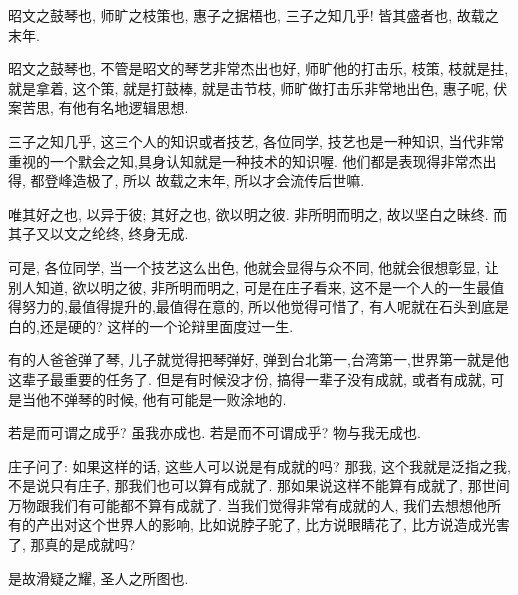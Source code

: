 \documentclass[11pt]{article}
\begin{document}
\begin{center}
	{\color{magenta} 昭文之鼓琴也, 师旷之枝策也, 惠子之据梧也, 三子之知几乎! 皆其盛者也, 故载之末年.}
\end{center}

\vspace{-0.5cm}

{\color{blue} 昭文之鼓琴也}, 不管是昭文的琴艺非常杰出也好, 师旷他的打击乐, 枝策, 枝就是拄, 就是拿着, 这个策, 就是打鼓棒, 就是击节枝, 师旷做打击乐非常地出色, 惠子呢, 伏案苦思, 有他有名地逻辑思想. 

{\color{blue} 三子之知几乎}, 这三个人的知识或者技艺, 各位同学, 技艺也是一种知识, 当代非常重视的一个默会之知,具身认知就是一种技术的知识喔. 他们都是表现得非常杰出得, 都登峰造极了, 所以{\color{blue} 故载之末年}, 所以才会流传后世嘛. 

\begin{center}
	{\color{magenta} 唯其好之也, 以异于彼; 其好之也, 欲以明之彼. 非所明而明之, 故以坚白之昧终. 而其子又以文之纶终, 终身无成.}
\end{center}

\vspace{-0.5cm}

可是, 各位同学, 当一个技艺这么出色, 他就会显得与众不同, 他就会很想彰显, 让别人知道, {\color{blue} 欲以明之彼, 非所明而明之}, 可是在庄子看来, 这不是一个人的一生最值得努力的,最值得提升的,最值得在意的, 所以他觉得可惜了, 有人呢就在石头到底是白的,还是硬的?  这样的一个论辩里面度过一生. 

有的人爸爸弹了琴, 儿子就觉得把琴弹好, 弹到台北第一,台湾第一,世界第一就是他这辈子最重要的任务了. 但是有时候没才份, 搞得一辈子没有成就, 或者有成就, 可是当他不弹琴的时候, 他有可能是一败涂地的.

\begin{center}
	{\color{magenta} 若是而可谓之成乎? 虽我亦成也. 若是而不可谓成乎? 物与我无成也.}
\end{center}

\vspace{-0.5cm}

庄子问了: 如果这样的话, 这些人可以说是有成就的吗? 那我, 这个我就是泛指之我, 不是说只有庄子, 那我们也可以算有成就了. 那如果说这样不能算有成就了, 那世间万物跟我们有可能都不算有成就了. 当我们觉得非常有成就的人, 我们去想想他所有的产出对这个世界人的影响, 比如说脖子驼了, 比方说眼睛花了, 比方说造成光害了, 那真的是成就吗? 

\begin{center}
	{\color{magenta} 是故滑疑之耀, 圣人之所图也.}
\end{center}
\end{document}
